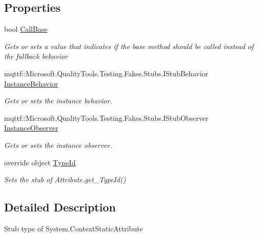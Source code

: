 \subsection*{Properties}
\begin{DoxyCompactItemize}
\item 
bool \hyperlink{class_system_1_1_fakes_1_1_stub_context_static_attribute_ae3ecc751ba6e956af977026fc088a7d0}{Call\-Base}
\begin{DoxyCompactList}\small\item\em Gets or sets a value that indicates if the base method should be called instead of the fallback behavior\end{DoxyCompactList}\item 
mqttf\-::\-Microsoft.\-Quality\-Tools.\-Testing.\-Fakes.\-Stubs.\-I\-Stub\-Behavior \hyperlink{class_system_1_1_fakes_1_1_stub_context_static_attribute_a23845da1c8365827dac10bfd2be89aad}{Instance\-Behavior}
\begin{DoxyCompactList}\small\item\em Gets or sets the instance behavior.\end{DoxyCompactList}\item 
mqttf\-::\-Microsoft.\-Quality\-Tools.\-Testing.\-Fakes.\-Stubs.\-I\-Stub\-Observer \hyperlink{class_system_1_1_fakes_1_1_stub_context_static_attribute_a0430931fbdbbf4d5f9007ecb06351f15}{Instance\-Observer}
\begin{DoxyCompactList}\small\item\em Gets or sets the instance observer.\end{DoxyCompactList}\item 
override object \hyperlink{class_system_1_1_fakes_1_1_stub_context_static_attribute_ae29095db29f16f93cb7fba1ac5b5dadf}{Type\-Id}
\begin{DoxyCompactList}\small\item\em Sets the stub of Attribute.\-get\-\_\-\-Type\-Id()\end{DoxyCompactList}\end{DoxyCompactItemize}


\subsection{Detailed Description}
Stub type of System.\-Context\-Static\-Attribute



